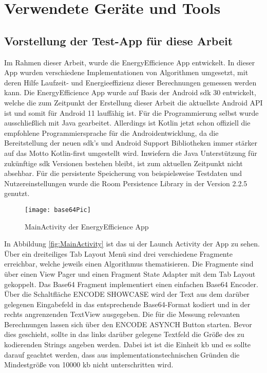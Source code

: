\chapter{Verwendete Geräte und Tools}
\section{Vorstellung der Test-App für diese Arbeit}
Im Rahmen dieser Arbeit, wurde die \glqq EnergyEfficience\grqq{} App entwickelt. In dieser App wurden verschiedene Implementationen von Algorithmen umgesetzt, mit deren Hilfe Laufzeit- und Energieeffizienz dieser Berechnungen gemessen werden kann.
Die \glqq EnergyEfficience\grqq{} App wurde auf Basis der Android \ac{sdk} 30 entwickelt, welche die zum Zeitpunkt der Erstellung dieser Arbeit die aktuellste Android API ist und somit für Android 11 lauffähig ist. Für die Programmierung selbst wurde ausschließlich mit Java gearbeitet. Allerdings ist Kotlin jetzt schon offiziell die empfohlene Programmiersprache für die Androidentwicklung, da die Bereitstellung der neuen \ac{sdk}'s und Android Support Bibliotheken immer stärker auf das Motto \glqq Kotlin-first\grqq{} \cite{kotlin-first} umgestellt wird. Inwiefern die Java Unterstützung für zukünftige \ac{sdk} Versionen bestehen bleibt, ist zum aktuellen Zeitpunkt nicht absehbar.
Für die persistente Speicherung von beispielsweise Testdaten und Nutzereinstellungen wurde die Room Persistence Library in der Version 2.2.5 genutzt.
\begin{figure}[H]
	\begin{center}	 
	\texttt{[image: base64Pic]}
	\caption{MainActivity der EnergyEfficience App}
	\label{fig:MainActivity} 
	\end{center}
\end{figure}
In Abbildung \autoref{fig:MainActivity} ist das \ac{ui} der Launch Activity der App zu sehen. Über ein dreiteiliges Tab Layout Menü sind drei verschiedene Fragmente erreichbar, welche jeweils einen Algorithmus thematisieren. Die Fragmente sind über einen View Pager und einen Fragment State Adapter mit dem Tab Layout gekoppelt. Das Base64 Fragment implementiert einen einfachen Base64 Encoder. Über die Schaltfläche \glqq ENCODE SHOWCASE\grqq{} wird der Text aus dem darüber gelegenen Eingabefeld in das entsprechende Base64-Format kodiert und in der rechts angrenzenden TextView ausgegeben. Die für die Messung relevanten Berechnungen lassen sich über den \glqq ENCODE ASYNCH\grqq{} Button starten. Bevor dies geschieht, sollte in das links darüber gelegene Textfeld die Größe des zu kodierenden Strings angeben werden. Dabei ist ist die Einheit \ac{kb} und es sollte darauf geachtet werden, dass aus implementationstechnischen Gründen die Mindestgröße von 10000 \ac{kb} nicht unterschritten wird. 
